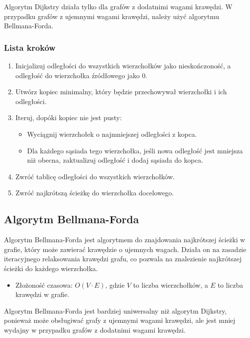 \documentclass{article}
\begin{document}
Algorytm Dijkstry działa tylko dla grafów z dodatnimi wagami krawędzi. 
W przypadku grafów z ujemnymi wagami krawędzi, należy użyć algorytmu Bellmana-Forda.

\subsubsection{Lista kroków}
\begin{enumerate}
    \item Inicjalizuj odległości do wszystkich wierzchołków jako nieskończoność, a odległość do wierzchołka źródłowego jako 0.
    \item Utwórz kopiec minimalny, który będzie przechowywał wierzchołki i ich odległości.
    \item Iteruj, dopóki kopiec nie jest pusty:
    \begin{itemize}
        \item Wyciągnij wierzchołek o najmniejszej odległości z kopca.
        \item Dla każdego sąsiada tego wierzchołka, jeśli nowa odległość jest mniejsza niż obecna, zaktualizuj odległość i dodaj sąsiada do kopca.
    \end{itemize}
    \item Zwróć tablicę odległości do wszystkich wierzchołków.
    \item Zwróć najkrótszą ścieżkę do wierzchołka docelowego.
\end{enumerate}

\subsection{Algorytm Bellmana-Forda}

Algorytm Bellmana-Forda jest algorytmem do znajdowania najkrótszej ścieżki w grafie, który może zawierać krawędzie o ujemnych wagach.
Działa on na zasadzie iteracyjnego relaksowania krawędzi grafu, co pozwala na znalezienie najkrótszej ścieżki do każdego wierzchołka.
\begin{itemize}
    \item Złożoność czasowa: $O(V \cdot E)$, gdzie $V$ to liczba wierzchołków, a $E$ to liczba krawędzi w grafie.
\end{itemize}

Algorytm Bellmana-Forda jest bardziej uniwersalny niż algorytm Dijkstry, ponieważ może obsługiwać grafy z ujemnymi wagami krawędzi, ale jest mniej wydajny w przypadku grafów z dodatnimi wagami krawędzi.
\end{document}
